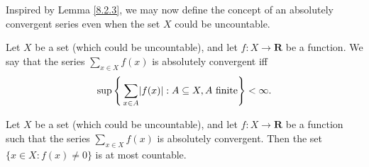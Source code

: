 \begin{note}
    Inspired by Lemma \ref{8.2.3}, we may now define the concept of an absolutely convergent series even when the set \(X\) could be uncountable.
\end{note}

\begin{definition}\label{8.2.4}
    Let \(X\) be a set (which could be uncountable), and let \(f : X \to \mathbf{R}\) be a function.
    We say that the series \(\sum_{x \in X} f(x)\) is absolutely convergent iff
    \[
        \sup\Bigg\{\sum_{x \in A} \abs*{f(x)} : A \subseteq X, A \text{ finite}\Bigg\} < \infty.
    \]
\end{definition}

\begin{lemma}\label{8.2.5}
    Let \(X\) be a set (which could be uncountable), and let \(f : X \to \mathbf{R}\) be a function such that the series \(\sum_{x \in X} f(x)\) is absolutely convergent.
    Then the set \(\{x \in X : f(x) \neq 0\}\) is at most countable.
\end{lemma}

